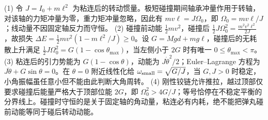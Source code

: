 (1) 令 \(J=I_0+m\ell^2\) 为粘连后的转动惯量。极短碰撞期间轴承冲量作用于转轴，对该轴的力矩冲量为零，重力矩冲量忽略，因此有 \(mv\ell=J\Omega_0\)，即 \(\Omega_0=mv\ell/J\)；线动量不因固定轴反力而守恒。
(2) 碰撞前动能 \(\frac12mv^2\)，碰撞后 \(\frac12J\Omega_0^2=\frac{m^2v^2\ell^2}{2J}\)，故损失 \(\Delta E=\frac12mv^2(1-m\ell^2/J)\ge0\)。设 \(G=Mg d+mg\ell\)，碰撞后的无耗散上升满足 \(\frac12J\Omega_0^2=G(1-\cos\theta_{\max})\)，当左侧小于 \(2G\) 时有唯一 \(0\le\theta_{\max}<\pi\)。
(3) 粘连后的引力势能为 \(G(1-\cos\theta)\)，动能为 \(J\dot\theta^2/2\)；Euler–Lagrange 方程为 \(J\ddot\theta+G\sin\theta=0\)。在 \(\theta=0\) 附近线性化给 \(\omega_{\rm small}=\sqrt{G/J}\)，当 \(G,J>0\) 时稳定，小角振幅虽任意小但不能由此判断大角周转。
(4) 刚性铰链允许推拉，越过顶部仅要求碰撞后能量严格大于顶部位能 \(2G\)，即 \(\Omega_0^2>4G/J\)；等号恰停在不稳定平衡的分界线上。碰撞时守恒的是关于固定轴的角动量，粘连必有内耗，绝不能把弹丸碰前动能等同于碰后转动动能。
